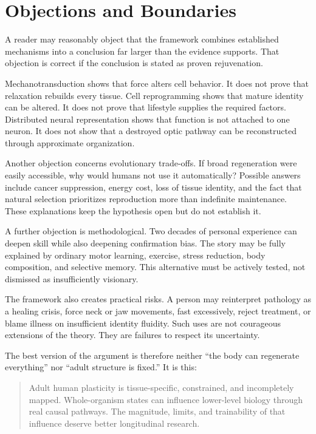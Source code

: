 \chapter{Objections and Boundaries}\label{chapter-19-objections-and-boundaries}

A reader may reasonably object that the framework combines established mechanisms into a conclusion far larger than the evidence supports. That objection is correct if the conclusion is stated as proven rejuvenation.

Mechanotransduction shows that force alters cell behavior. It does not prove that relaxation rebuilds every tissue. Cell reprogramming shows that mature identity can be altered. It does not prove that lifestyle supplies the required factors. Distributed neural representation shows that function is not attached to one neuron. It does not show that a destroyed optic pathway can be reconstructed through approximate organization.

Another objection concerns evolutionary trade-offs. If broad regeneration were easily accessible, why would humans not use it automatically? Possible answers include cancer suppression, energy cost, loss of tissue identity, and the fact that natural selection prioritizes reproduction more than indefinite maintenance. These explanations keep the hypothesis open but do not establish it.

A further objection is methodological. Two decades of personal experience can deepen skill while also deepening confirmation bias. The story may be fully explained by ordinary motor learning, exercise, stress reduction, body composition, and selective memory. This alternative must be actively tested, not dismissed as insufficiently visionary.

The framework also creates practical risks. A person may reinterpret pathology as a healing crisis, force neck or jaw movements, fast excessively, reject treatment, or blame illness on insufficient identity fluidity. Such uses are not courageous extensions of the theory. They are failures to respect its uncertainty.

The best version of the argument is therefore neither ``the body can regenerate everything'' nor ``adult structure is fixed.'' It is this:

\begin{quote}
Adult human plasticity is tissue-specific, constrained, and incompletely mapped. Whole-organism states can influence lower-level biology through real causal pathways. The magnitude, limits, and trainability of that influence deserve better longitudinal research.
\end{quote}
